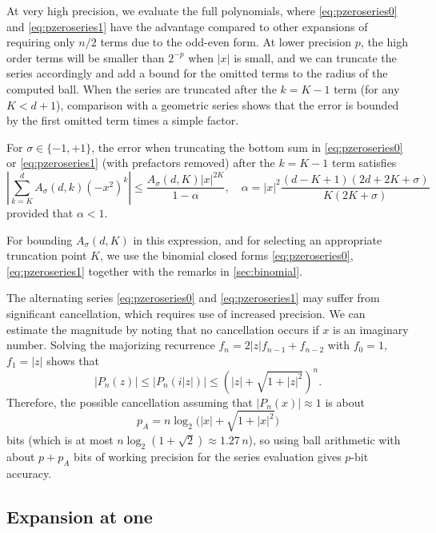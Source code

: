 \documentclass[nohypdvips,review]{siamart0216}
\begin{document}
At very high precision, we evaluate the full polynomials,
where \cref{eq:pzeroseries0} and \cref{eq:pzeroseries1}
have the advantage compared to other expansions
of requiring only $n/2$ terms due to the odd-even form.
At lower precision $p$, the high order terms will be smaller than
$2^{-p}$ when $|x|$ is small, and we can truncate the series
accordingly and add a bound for the omitted terms
to the radius of the computed ball.
When the series are truncated after the $k = K - 1$ term
(for any $K < d + 1$), comparison with a geometric series
shows that the error is bounded by the first
omitted term times a simple factor.

\begin{proposition}
For $\sigma \in \{-1,+1\}$, the error when truncating
the bottom sum in
\cref{eq:pzeroseries0} or \cref{eq:pzeroseries1} (with prefactors removed)
after the $k = K - 1$ term satisfies
\begin{equation}
\label{eq:truncerr1}
\left| \sum_{k=K}^d A_{\sigma}(d,k) (-x^2)^k \right| \le \frac{A_{\sigma}(d,K) |x|^{2K}}{1-\alpha},
\quad\!\! \alpha = |x|^2 \frac{(d-K+1)(2d+2K+\sigma)}{K (2K+\sigma)}
\end{equation}
provided that $\alpha < 1$.
\end{proposition}

For bounding $A_{\sigma}(d,K)$ in this expression, and for selecting an
appropriate truncation point $K$, we use the binomial closed forms
\cref{eq:pzeroseries0}, \cref{eq:pzeroseries1} together with the
remarks in \cref{sec:binomial}.

The alternating series \cref{eq:pzeroseries0} and \cref{eq:pzeroseries1}
may suffer from significant cancellation, which requires use of
increased precision.
We can estimate the magnitude by
noting that no cancellation occurs
if $x$ is an imaginary number.
Solving the majorizing recurrence $f_n = 2 |z| f_{n-1} + f_{n-2}$ with
$f_0 = 1$, $f_1 = |z|$ shows that
\[ |P_n(z)| \le |P_n(i|z|)| \le \left(|z| + \sqrt{1 + |z|^2}\right)^n. \]
Therefore, the possible cancellation assuming that $|P_n(x)| \approx 1$
is about
\begin{equation*}
p_A = n \log_2\bigl(|x| + \sqrt{1 + |x|^2}\bigr)
\end{equation*}
bits (which is at most $n \log_2 (1+\sqrt{2}) \approx 1.27\, n$),
so using ball arithmetic with about $p + p_A$ bits of working precision
for the series evaluation gives $p$-bit accuracy.

\subsection{Expansion at one}
\end{document}
